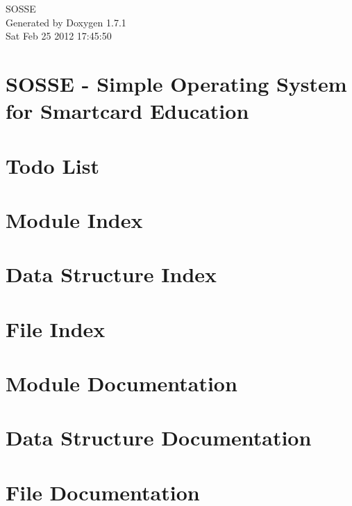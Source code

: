 \documentclass[a4paper]{article}
\begin{document}
\begin{titlepage}
\vspace*{7cm}
\begin{center}
{\Large SOSSE }\\
\vspace*{1cm}
{\large Generated by Doxygen 1.7.1}\\
\vspace*{0.5cm}
{\small Sat Feb 25 2012 17:45:50}\\
\end{center}
\end{titlepage}
\tableofcontents
{}
\section{SOSSE -\/ Simple Operating System for Smartcard Education}
\label{index}
\section{Todo List}
\label{todo}

\section{Module Index}

\section{Data Structure Index}

\section{File Index}

\section{Module Documentation}


\section{Data Structure Documentation}



\section{File Documentation}







































\printindex
\end{document}
